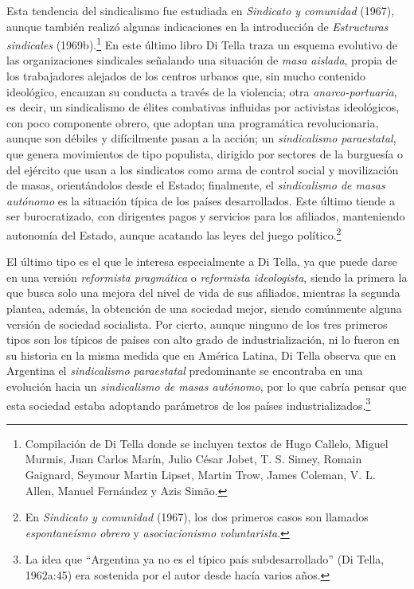 Esta tendencia del sindicalismo fue estudiada en \emph{Sindicato y comunidad} (1967), aunque también realizó algunas indicaciones en la introducción de \emph{Estructuras sindicales} (1969b).\footnote{Compilación de Di Tella donde se incluyen textos de Hugo Callelo, Miguel Murmis, Juan Carlos Marín, Julio César Jobet, T. S. Simey, Romain Gaignard, Seymour Martin Lipset, Martin Trow, James Coleman, V. L. Allen, Manuel Fernández y Azis Simão.} En este último libro Di Tella traza un esquema evolutivo de las organizaciones sindicales señalando una situación de \emph{masa aislada}, propia de los trabajadores alejados de los centros urbanos que, sin mucho contenido ideológico, encauzan su conducta a través de la violencia; otra \emph{anarco-portuaria}, es decir, un sindicalismo de élites combativas influidas por activistas ideológicos, con poco componente obrero, que adoptan una programática revolucionaria, aunque son débiles y difícilmente pasan a la acción; un \emph{sindicalismo paraestatal}, que genera movimientos de tipo populista, dirigido por sectores de la burguesía o del ejército que usan a los sindicatos como arma de control social y movilización de masas, orientándolos desde el Estado; finalmente, el \emph{sindicalismo de masas autónomo} es la situación típica de los países desarrollados. Este último tiende a ser burocratizado, con dirigentes pagos y servicios para los afiliados, manteniendo autonomía del Estado, aunque acatando las leyes del juego político.\footnote{En \emph{Sindicato y comunidad} (1967), los dos primeros casos son llamados \emph{espontaneísmo obrero} y \emph{asociacionismo voluntarista}.}

El último tipo es el que le interesa especialmente a Di Tella, ya que puede darse en una versión \emph{reformista pragmática} o \emph{reformista ideologista}, siendo la primera la que busca solo una mejora del nivel de vida de sus afiliados, mientras la segunda plantea, además, la obtención de una sociedad mejor, siendo comúnmente alguna versión de sociedad socialista. Por cierto, aunque ninguno de los tres primeros tipos son los típicos de países con alto grado de industrialización, ni lo fueron en su historia en la misma medida que en América Latina, Di Tella observa que en Argentina el \emph{sindicalismo paraestatal} predominante se encontraba en una evolución hacia un \emph{sindicalismo de masas autónomo}, por lo que cabría pensar que esta sociedad estaba adoptando parámetros de los países industrializados.\footnote{La idea que \enquote{Argentina ya no es el típico país subdesarrollado} (Di Tella, 1962a:45) era sostenida por el autor desde hacía varios años.}

